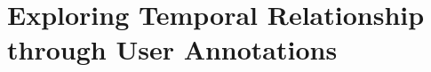 \chapter{Exploring Temporal Relationship through User Annotations}

\graphicspath{{Chapter3/figures/}}

%
%
%
%
%
